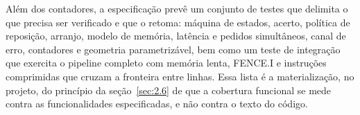 Além dos contadores, a especificação prevê um conjunto de testes que delimita o que precisa ser verificado e que o  retoma: máquina de estados, acerto, política de reposição, arranjo, modelo de memória, latência e pedidos simultâneos, canal de erro, contadores e geometria parametrizável, bem como um teste de integração que exercita o pipeline completo com memória lenta, FENCE.I e instruções comprimidas que cruzam a fronteira entre linhas. Essa lista é a materialização, no projeto, do princípio da seção~\ref{sec:2.6} de que a cobertura funcional se mede contra as funcionalidades especificadas, e não contra o texto do código.

